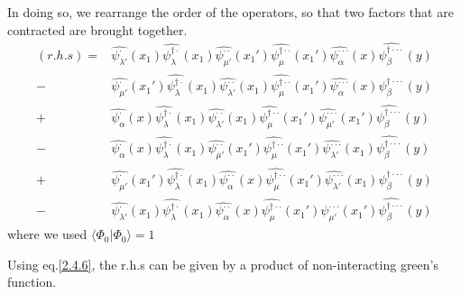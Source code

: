 In doing so, we rearrange the order of the operators, so that two factors that are contracted are brought together.
\begin{align}
(r.h.s)=&\hat{\psi_{\lambda'}^{\cdot}}(x_1)\hat{\psi_{\lambda}^{\dagger\cdot}}(x_1)\hat{\psi_{\mu'}^{\cdot\cdot}}(x_1')\hat{\psi_{\mu}^{\dagger\cdot\cdot}}(x_1')\hat{\psi_{\alpha}^{\cdot\cdot\cdot}}(x)\hat{\psi_{\beta}^{\dagger\cdot\cdot\cdot}}(y)\nonumber \\
-&\hat{\psi_{\mu'}^{\cdot}}(x_1')\hat{\psi_{\lambda}^{\dagger\cdot}}(x_1)\hat{\psi_{\lambda'}^{\cdot\cdot}}(x_1)\hat{\psi_{\mu}^{\dagger\cdot\cdot}}(x_1')\hat{\psi_{\alpha}^{\cdot\cdot\cdot}}(x)\hat{\psi_{\beta}^{\dagger\cdot\cdot\cdot}}(y)\nonumber \\
+&\hat{\psi_{\alpha}^{\cdot}}(x)\hat{\psi_{\lambda}^{\dagger\cdot}}(x_1)\hat{\psi_{\lambda'}^{\cdot\cdot}}(x_1)\hat{\psi_{\mu}^{\dagger\cdot\cdot}}(x_1')\hat{\psi_{\mu'}^{\cdot\cdot\cdot}}(x_1')\hat{\psi_{\beta}^{\dagger\cdot\cdot\cdot}}(y)\nonumber \\
-&\hat{\psi_{\alpha}^{\cdot}}(x)\hat{\psi_{\lambda}^{\dagger\cdot}}(x_1)\hat{\psi_{\mu'}^{\cdot\cdot}}(x_1')\hat{\psi_{\mu}^{\dagger\cdot\cdot}}(x_1')\hat{\psi_{\lambda'}^{\cdot\cdot\cdot}}(x_1)\hat{\psi_{\beta}^{\dagger\cdot\cdot\cdot}}(y)\nonumber \\
+&\hat{\psi_{\mu'}^{\cdot}}(x_1')\hat{\psi_{\lambda}^{\dagger\cdot}}(x_1)\hat{\psi_{\alpha}^{\cdot\cdot}}(x)\hat{\psi_{\mu}^{\dagger\cdot\cdot}}(x_1')\hat{\psi_{\lambda'}^{\cdot\cdot\cdot}}(x_1)\hat{\psi_{\beta}^{\dagger\cdot\cdot\cdot}}(y)\nonumber \\
-&\hat{\psi_{\lambda'}^{\cdot}}(x_1)\hat{\psi_{\lambda}^{\dagger\cdot}}(x_1)\hat{\psi_{\alpha}^{\cdot\cdot}}(x)\hat{\psi_{\mu}^{\dagger\cdot\cdot}}(x_1')\hat{\psi_{\mu'}^{\cdot\cdot\cdot}}(x_1')\hat{\psi_{\beta}^{\dagger\cdot\cdot\cdot}}(y)\nonumber 
\end{align}
where we used $\langle\Phi_0|\Phi_0\rangle=1$

Using eq.\ref{2.4.6}, the r.h.s can be given by a product of non-interacting green's function.

